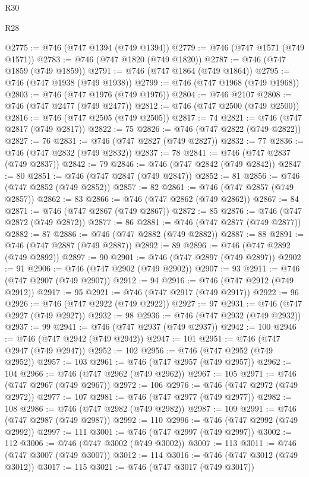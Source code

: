 \begin{lexlean}{R30}
\begin{lexlean}{R28}
\begin{coremodule}
{{{{{{{{{{{{{{{{{{{{{{{{{{{{{{{{{{{{{{{{{{{{{{{{{{{{{{{{{{{{{{{{{{{{{{{{{{{{{{{{{{{{{{{{{{{{{{{{{{{{{{{{{{{{{{{{{{{{{{{{{{{{{{{{{{{{{{{{{{{{{{{@2775 := @746 (@747 @1394 (@749 @1394))
@2779 := @746 (@747 @1571 (@749 @1571))
@2783 := @746 (@747 @1820 (@749 @1820))
@2787 := @746 (@747 @1859 (@749 @1859))
@2791 := @746 (@747 @1864 (@749 @1864))
@2795 := @746 (@747 @1938 (@749 @1938))
@2799 := @746 (@747 @1968 (@749 @1968))
@2803 := @746 (@747 @1976 (@749 @1976))
@2804 := @746 @2107
@2808 := @746 (@747 @2477 (@749 @2477))
@2812 := @746 (@747 @2500 (@749 @2500))
@2816 := @746 (@747 @2505 (@749 @2505))
@2817 := 74
@2821 := @746 (@747 @2817 (@749 @2817))
@2822 := 75
@2826 := @746 (@747 @2822 (@749 @2822))
@2827 := 76
@2831 := @746 (@747 @2827 (@749 @2827))
@2832 := 77
@2836 := @746 (@747 @2832 (@749 @2832))
@2837 := 78
@2841 := @746 (@747 @2837 (@749 @2837))
@2842 := 79
@2846 := @746 (@747 @2842 (@749 @2842))
@2847 := 80
@2851 := @746 (@747 @2847 (@749 @2847))
@2852 := 81
@2856 := @746 (@747 @2852 (@749 @2852))
@2857 := 82
@2861 := @746 (@747 @2857 (@749 @2857))
@2862 := 83
@2866 := @746 (@747 @2862 (@749 @2862))
@2867 := 84
@2871 := @746 (@747 @2867 (@749 @2867))
@2872 := 85
@2876 := @746 (@747 @2872 (@749 @2872))
@2877 := 86
@2881 := @746 (@747 @2877 (@749 @2877))
@2882 := 87
@2886 := @746 (@747 @2882 (@749 @2882))
@2887 := 88
@2891 := @746 (@747 @2887 (@749 @2887))
@2892 := 89
@2896 := @746 (@747 @2892 (@749 @2892))
@2897 := 90
@2901 := @746 (@747 @2897 (@749 @2897))
@2902 := 91
@2906 := @746 (@747 @2902 (@749 @2902))
@2907 := 93
@2911 := @746 (@747 @2907 (@749 @2907))
@2912 := 94
@2916 := @746 (@747 @2912 (@749 @2912))
@2917 := 95
@2921 := @746 (@747 @2917 (@749 @2917))
@2922 := 96
@2926 := @746 (@747 @2922 (@749 @2922))
@2927 := 97
@2931 := @746 (@747 @2927 (@749 @2927))
@2932 := 98
@2936 := @746 (@747 @2932 (@749 @2932))
@2937 := 99
@2941 := @746 (@747 @2937 (@749 @2937))
@2942 := 100
@2946 := @746 (@747 @2942 (@749 @2942))
@2947 := 101
@2951 := @746 (@747 @2947 (@749 @2947))
@2952 := 102
@2956 := @746 (@747 @2952 (@749 @2952))
@2957 := 103
@2961 := @746 (@747 @2957 (@749 @2957))
@2962 := 104
@2966 := @746 (@747 @2962 (@749 @2962))
@2967 := 105
@2971 := @746 (@747 @2967 (@749 @2967))
@2972 := 106
@2976 := @746 (@747 @2972 (@749 @2972))
@2977 := 107
@2981 := @746 (@747 @2977 (@749 @2977))
@2982 := 108
@2986 := @746 (@747 @2982 (@749 @2982))
@2987 := 109
@2991 := @746 (@747 @2987 (@749 @2987))
@2992 := 110
@2996 := @746 (@747 @2992 (@749 @2992))
@2997 := 111
@3001 := @746 (@747 @2997 (@749 @2997))
@3002 := 112
@3006 := @746 (@747 @3002 (@749 @3002))
@3007 := 113
@3011 := @746 (@747 @3007 (@749 @3007))
@3012 := 114
@3016 := @746 (@747 @3012 (@749 @3012))
@3017 := 115
@3021 := @746 (@747 @3017 (@749 @3017))
}}}}}}}}}}}}}}}}}}}}}}}}}}}}}}}}}}}}}}}}}}}}}}}}}}}}}}}}}}}}}}}}}}}}}}}}}}}}}}}}}}}}}}}}}}}}}}}}}}}}}}}}}}}}}}}}}}}}}}}}}}}}}}}}}}}}}}}}}}}}}}}
\end{coremodule}
\end{lexlean}
\end{lexlean}
